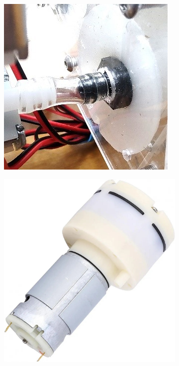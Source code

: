 \documentclass[twoside]{article}
\begin{document}
\begin{figure}[H]
	\centering
	\begin{subfigure}[b]{0.33\linewidth}
		\centering
		\includegraphics[width=\textwidth]{air_connection}
	\end{subfigure}%
	\begin{subfigure}[b]{0.33\linewidth}
		\centering		
		\includegraphics[width=\textwidth]{air pump}

\end{subfigure}
\end{figure}
\end{document}
